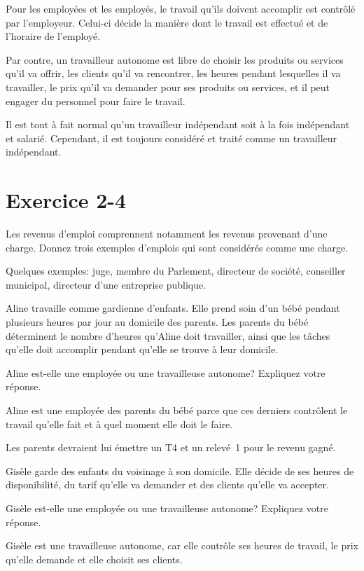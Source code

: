 Pour les employées et les employés, le travail qu'ils doivent accomplir est contrôlé par l'employeur. Celui-ci décide la manière dont le travail est effectué et de l'horaire de l'employé.  

Par contre, un travailleur autonome est libre de choisir les produits ou services qu'il va offrir, les clients qu'il va rencontrer, les heures pendant lesquelles il va travailler, le prix qu'il va demander pour ses produits ou services, et il peut engager du personnel pour faire le travail.
\begin{note}
	Il est tout à fait normal qu'un travailleur indépendant soit à la fois indépendant et salarié. Cependant, il est toujours considéré et traité comme un travailleur indépendant.
\end{note}



\section{Exercice 2-4}
\setcounter{question}{0}
\begin{question}
	Les revenus d'emploi comprennent notamment les revenus provenant d'une charge. Donnez trois exemples d'emplois qui sont considérés comme une charge.
\end{question}
Quelques exemples: juge, membre du Parlement, directeur de société, conseiller municipal, directeur d'une entreprise publique.

\begin{question}
	Aline travaille comme gardienne d'enfants. Elle prend soin d'un bébé pendant plusieurs heures par jour au domicile des parents. Les parents du bébé déterminent le nombre d'heures qu'Aline doit travailler, ainsi que les tâches qu'elle doit accomplir pendant qu'elle se trouve à leur domicile. 
	
	Aline est-elle une employée ou une travailleuse autonome? Expliquez votre réponse.
\end{question}
Aline est une employée des parents du bébé parce que ces derniers contrôlent le travail qu'elle fait et à quel moment elle doit le faire.

Les parents devraient lui émettre un T4 et un relevé~1 pour le revenu gagné.

\begin{question}
	Gisèle garde des enfants du voisinage à son domicile. Elle décide de ses heures de disponibilité, du tarif qu'elle va demander et des clients qu'elle va accepter. 
	
	Gisèle est-elle une employée ou une travailleuse autonome? 
	Expliquez votre réponse.
\end{question}
Gisèle est une travailleuse autonome, car elle contrôle ses heures de travail, le prix qu'elle demande et elle choisit ses clients.



